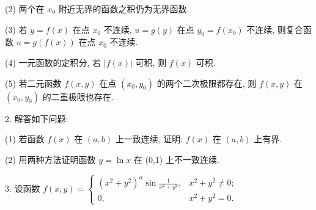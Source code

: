\documentclass{examcollection}
\begin{document}
{\begin{minipage}{\textwidth}
(2) 两个在 $x_0$ 附近无界的函数之积仍为无界函数.\par
(3) 若 $y = f(x)$ 在点 $x_0$ 不连续, $u = g(y)$ 在点 $y_0 = f(x_0)$ 不连续, 则复合函数 $u = g(f(x))$ 在点 $x_0$ 不连续.\par
(4) 一元函数的定积分, 若 $|f(x)|$ 可积, 则 $f(x)$ 可积.\par
(5) 若二元函数 $f(x, y)$ 在点 $(x_0, y_0)$ 的两个二次极限都存在, 则 $f(x, y)$ 在 $(x_0, y_0)$ 的二重极限也存在.\par
2. 解答如下问题:\par
(1) 若函数 $f(x)$ 在 $(a, b)$ 上一致连续, 证明: $f(x)$ 在 $(a, b)$ 上有界.\par
(2) 用两种方法证明函数 $y = \ln x$ 在 (0,1) 上不一致连续.\par
3. 设函数 $f(x, y) = \begin{cases} (x^2 + y^2)^{\alpha} \sin \frac{1}{x^2 + y^2}, & x^2 + y^2 \neq 0; \\ 0, & x^2 + y^2 = 0. \end{cases}$\par
\end{minipage}}
\ifdim\dimexpr\ht\proofbox+\dp\proofbox\relax>\textheight
\noindent\resizebox{!}{\textheight}{\usebox{\proofbox}}\else\noindent\usebox{\proofbox}\fi\clearpage
\end{document}
